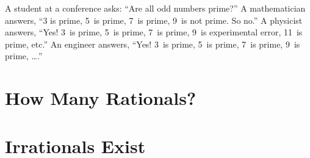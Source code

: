 \documentclass[twocolumn]{article}
\begin{document}
A student at a conference asks: ``Are all odd numbers prime?''
A mathematician answers, ``3 is prime, 5~is prime, 7~is prime, 9~is
not prime.  So no.''
A physicist answers, ``Yes!  3~is prime, 5~is prime, 7~is prime, 9~is
experimental error, 11~is prime, etc.''
An engineer answers, ``Yes!  3~is prime, 5~is prime, 7~is prime, 9~is
prime, \ldots.''

\section{How Many Rationals?}

\section{Irrationals Exist}
\end{document}
